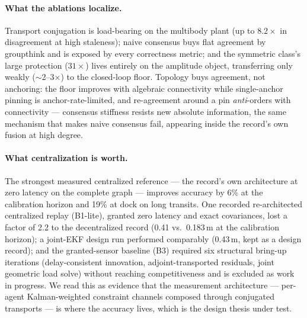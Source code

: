 \documentclass[letterpaper, 10pt, journal]{IEEEtran}
\begin{document}
\paragraph{What the ablations localize.} Transport conjugation is load-bearing
on the multibody plant (up to $8.2\times$ in disagreement at high staleness);
naive consensus buys flat agreement by groupthink and is exposed by every
correctness metric; and the symmetric class's large protection ($31\times$)
lives entirely on the amplitude object, transferring only weakly ($\sim$2--3$\times$)
to the closed-loop floor. Topology buys agreement, not anchoring: the floor
improves with algebraic connectivity while single-anchor pinning is
anchor-rate-limited, and re-agreement around a pin \emph{anti}-orders with
connectivity --- consensus stiffness resists new absolute information, the same
mechanism that makes naive consensus fail, appearing inside the record's own
fusion at high degree.

\paragraph{What centralization is worth.} The strongest measured centralized
reference --- the record's own architecture at zero latency on the complete
graph --- improves accuracy by 6\% at the calibration horizon and 19\% at
dock on long transits. One recorded re-architected centralized replay
(B1-lite), granted zero latency and exact covariances, lost a factor of 2.2
to the decentralized record (0.41 vs.\ 0.183\,m at the calibration horizon);
a joint-EKF design run performed comparably (0.43\,m, kept as a design
record); and the granted-sensor baseline (B3) required six structural
bring-up iterations (delay-consistent innovation, adjoint-transported
residuals, joint geometric load solve) without reaching competitiveness and
is excluded as work in progress. We
read this as evidence that the measurement architecture --- per-agent
Kalman-weighted constraint channels composed through conjugated transports ---
is where the accuracy lives, which is the design thesis under test.
\end{document}
